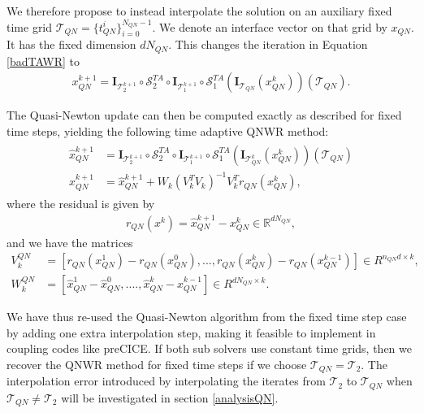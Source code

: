 We therefore propose to instead interpolate the solution on an auxiliary fixed time grid $\mathcal{T}_{QN} = \{t^i_{QN}\}_{i=0}^{N_{QN}-1}$. We denote an interface vector on that grid by $x_{QN}$. It has the fixed dimension $dN_{QN}$. This changes the iteration in Equation \eqref{badTAWR} to
\begin{align} \label{WRTAQN}
	x_{QN}^{k+1} = \mathbf{I}_{\mathcal{T}_2^{k+1}} \circ \mathcal{S}^{TA}_{2}  \circ \mathbf{I}_{\mathcal{T}_1^{k+1}} \circ \mathcal{S}^{TA}_{1}\left( \mathbf{I}_{\mathcal{T}_{QN}}\left(x_{QN}^{k}\right)\right)\left(\mathcal{T}_{QN}\right).
\end{align} 

The Quasi-Newton update can then be computed exactly as described for fixed time steps, yielding the following time adaptive QNWR method:
 \begin{align}\label{timeAdaptiveQN}
	\begin{split}
		\hat{x}_{QN}^{k+1} &= \mathbf{I}_{\mathcal{T}_2^{k+1}} \circ \mathcal{S}^{TA}_{2}  \circ \mathbf{I}_{\mathcal{T}_1^{k+1}} \circ \mathcal{S}^{TA}_{1}\left( \mathbf{I}_{\mathcal{T}_{QN}^k}\left(x_{QN}^{k}\right)\right)\left(\mathcal{T}_{QN}\right) \\
		x_{QN}^{k+1} &= \hat{x}_{QN}^{k+1} + W_k (V_k^T V_k)^{-1}V_k^{T} r_{QN}(x_ {QN}^k),
	\end{split}
\end{align}
where the residual is given by 
\begin{align*}
	r_{QN}(x^k) = \hat{x}_{QN}^{k+1} - x^{k}_{QN} \in \mathbb{R}^{d N_{QN}},
\end{align*} 
and we have the matrices 
\begin{align*}
	V^{QN}_k &= [r_{QN}(x_{QN}^1)-r_{QN}(x_{QN}^0), ... , r_{QN}(x_{QN}^k)-r_{QN}(x_{QN}^{k-1})]  \in R^{n_{QN} d  \times k},\\
	W^{QN}_k &= [\hat{x}_{QN}^1 -\hat{x}_{QN}^0, .... , \hat{x}_{QN}^{k}- \hat{x}_{QN}^{k-1}] \in R^{d N_{QN}  \times k}.
\end{align*}

We have thus re-used the Quasi-Newton algorithm from the fixed time step case by adding one extra interpolation step, making it feasible to implement in coupling codes like preCICE. If both sub solvers use constant time grids, then we recover the QNWR method for fixed time steps if we choose $\mathcal{T}_{QN} = \mathcal{T}_2$. The interpolation error introduced by interpolating the iterates from $\mathcal{T}_2$ to $\mathcal{T}_{QN}$ when $\mathcal{T}_{QN} \neq \mathcal{T}_2$ will be investigated in section \ref{analysisQN}. 


